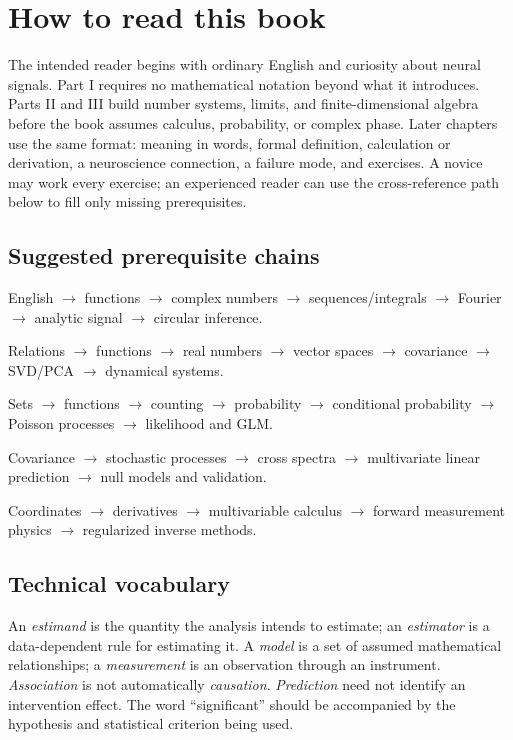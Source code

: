 \chapter{How to read this book}
The intended reader begins with ordinary English and curiosity about neural signals. Part I requires no mathematical notation beyond what it introduces. Parts II and III build number systems, limits, and finite-dimensional algebra before the book assumes calculus, probability, or complex phase. Later chapters use the same format: meaning in words, formal definition, calculation or derivation, a neuroscience connection, a failure mode, and exercises. A novice may work every exercise; an experienced reader can use the cross-reference path below to fill only missing prerequisites.

\section*{Suggested prerequisite chains}
\begin{description}[leftmargin=2cm,style=nextline]
\item[Hilbert and PAC] English $\to$ functions $\to$ complex numbers $\to$ sequences/integrals $\to$ Fourier $\to$ analytic signal $\to$ circular inference.
\item[PCA and manifolds] Relations $\to$ functions $\to$ real numbers $\to$ vector spaces $\to$ covariance $\to$ SVD/PCA $\to$ dynamical systems.
\item[Spike GLMs] Sets $\to$ functions $\to$ counting $\to$ probability $\to$ conditional probability $\to$ Poisson processes $\to$ likelihood and GLM.
\item[Granger analysis] Covariance $\to$ stochastic processes $\to$ cross spectra $\to$ multivariate linear prediction $\to$ null models and validation.
\item[Current source density] Coordinates $\to$ derivatives $\to$ multivariable calculus $\to$ forward measurement physics $\to$ regularized inverse methods.
\end{description}

\section*{Technical vocabulary}
An \emph{estimand} is the quantity the analysis intends to estimate; an \emph{estimator} is a data-dependent rule for estimating it. A \emph{model} is a set of assumed mathematical relationships; a \emph{measurement} is an observation through an instrument. \emph{Association} is not automatically \emph{causation}. \emph{Prediction} need not identify an intervention effect. The word ``significant'' should be accompanied by the hypothesis and statistical criterion being used.

